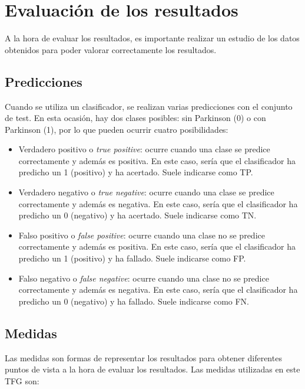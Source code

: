 \section{Evaluación de los resultados}
A la hora de evaluar los resultados, es importante realizar un estudio de los datos obtenidos para poder valorar correctamente los resultados.

\subsection{Predicciones}
Cuando se utiliza un clasificador, se realizan varias predicciones con el conjunto de test. En esta ocasión, hay dos clases posibles: sin Parkinson (0) o con Parkinson (1), por lo que pueden ocurrir cuatro posibilidades:

\begin{itemize}
	\item Verdadero positivo o \textit{true positive}: ocurre cuando una clase se predice correctamente y además es positiva. En este caso, sería que el clasificador ha predicho un 1 (positivo) y ha acertado. Suele indicarse como TP.
	\item Verdadero negativo o \textit{true negative}: ocurre cuando una clase se predice correctamente y además es negativa. En este caso, sería que el clasificador ha predicho un 0 (negativo) y ha acertado. Suele indicarse como TN.
	\item Falso positivo o \textit{false positive}: ocurre cuando una clase no se predice correctamente y además es positiva. En este caso, sería que el clasificador ha predicho un 1 (positivo) y ha fallado. Suele indicarse como FP.
	\item Falso negativo o \textit{false negative}: ocurre cuando una clase no se predice correctamente y además es negativa. En este caso, sería que el clasificador ha predicho un 0 (negativo) y ha fallado. Suele indicarse como FN.
	
\end{itemize}

\subsection{Medidas}
Las medidas son formas de representar los resultados para obtener diferentes puntos de vista a la hora de evaluar los resultados. Las medidas utilizadas en este TFG son:

